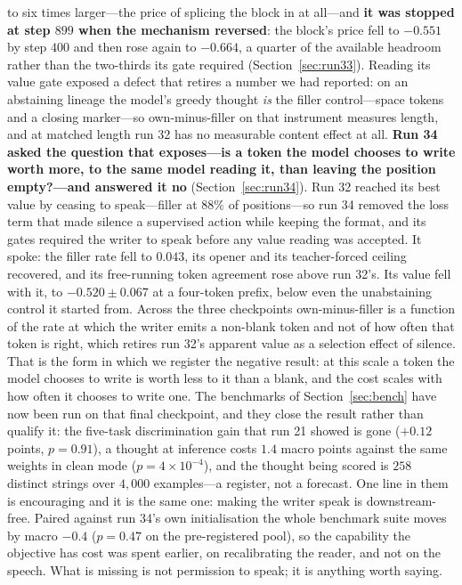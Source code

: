 \documentclass{article} %
\begin{document}
to six times larger---the price of splicing the block in at all---and \textbf{it was stopped at step $899$
when the mechanism reversed}: the block's price fell to $-0.551$ by step $400$ and then rose again to
$-0.664$, a quarter of the available headroom rather than the two-thirds its gate required
(Section~\ref{sec:run33}). Reading its value gate exposed a defect that retires a number we had reported:
on an abstaining lineage the model's greedy thought \emph{is} the filler control---space tokens and a
closing marker---so own-minus-filler on that instrument measures length, and at matched length run 32 has
no measurable content effect at all. \textbf{Run 34 asked the question that exposes---is a token the model chooses to write worth more, to the
same model reading it, than leaving the position empty?---and answered it no} (Section~\ref{sec:run34}).
Run 32 reached its best value by ceasing to speak---filler at $88\%$ of positions---so run 34 removed the
loss term that made silence a supervised action while keeping the format, and its gates required the writer
to speak before any value reading was accepted. It spoke: the filler rate fell to $0.043$, its opener and
its teacher-forced ceiling recovered, and its free-running token agreement rose above run 32's. Its value
fell with it, to $-0.520 \pm 0.067$ at a four-token prefix, below even the unabstaining control it started
from. Across the three checkpoints own-minus-filler is a function of the rate at which the writer emits a
non-blank token and not of how often that token is right, which retires run 32's apparent value as a
selection effect of silence. That is the form in which we register the negative result: at this scale a
token the model chooses to write is worth less to it than a blank, and the cost scales with how often it
chooses to write one. The benchmarks of Section~\ref{sec:bench} have now been run on that final checkpoint, and they close the result rather than qualify it: the five-task discrimination gain that run 21 showed is gone ($+0.12$ points, $p = 0.91$), a thought at inference costs $1.4$ macro points against the same weights in clean mode ($p = 4\times10^{-4}$), and the thought being scored is $258$ distinct strings over $4{,}000$ examples---a register, not a forecast. One line in them is encouraging and it is the same one: making the writer speak is downstream-free. Paired against run 34's own initialisation the whole benchmark suite moves by macro $-0.4$ ($p = 0.47$ on the pre-registered pool), so the capability the objective has cost was spent earlier, on recalibrating the reader, and not on the speech. What is missing is not permission to speak; it is anything worth saying.
\end{document}
